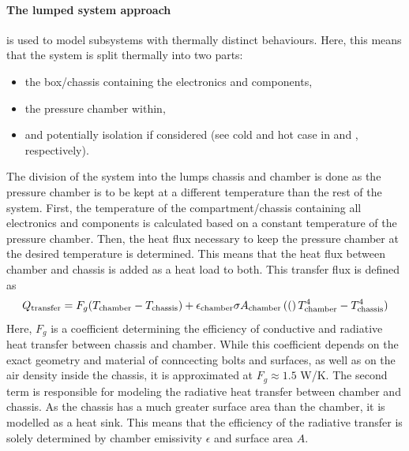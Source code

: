 \paragraph{The lumped system approach} is used to model subsystems with thermally distinct behaviours. Here, this means that the system is split thermally into two parts: 
\begin{itemize}
    \item the box/chassis containing the electronics and components, 
    \item the pressure chamber within,
    \item and potentially isolation if considered (see cold and hot case in  and , respectively).
\end{itemize}
The division of the system into the lumps chassis and chamber is done as the pressure chamber is to be kept at a different temperature than the rest of the system. First, the temperature of the compartment/chassis containing all electronics and components is calculated based on a constant temperature of the pressure chamber. Then, the heat flux necessary to keep the pressure chamber at the desired temperature is determined. This means that the heat flux between chamber and chassis is added as a heat load to both. 
This transfer flux is defined as 
\begin{align}
    Q_\mathrm{transfer} = F_g (T_\mathrm{chamber}-T_\mathrm{chassis}) + \epsilon_\mathrm{chamber}\sigma A_\mathrm{chamber}\left( ( \right)T_\mathrm{chamber}^4-T_\mathrm{chassis}^4)
\end{align}
Here, $F_g$ is a coefficient determining the efficiency of conductive and radiative heat transfer between chassis and chamber. While this coefficient depends on the exact geometry and material of conncecting bolts and surfaces, as well as on the air density inside the chassis, it is approximated at $F_g\approx 1.5$ W/K. The second term is responsible for modeling the radiative heat transfer between chamber and chassis. As the chassis has a much greater surface area than the chamber, it is modelled as a heat sink. This means that the efficiency of the radiative transfer is solely determined by chamber emissivity $\epsilon$ and surface area $A$.

